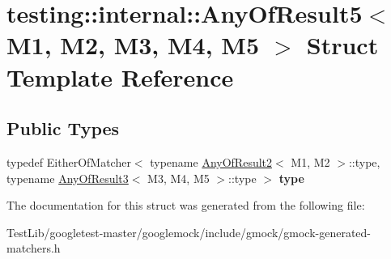 \hypertarget{structtesting_1_1internal_1_1AnyOfResult5}{}\section{testing\+:\+:internal\+:\+:Any\+Of\+Result5$<$ M1, M2, M3, M4, M5 $>$ Struct Template Reference}
\label{structtesting_1_1internal_1_1AnyOfResult5}
\subsection*{Public Types}
\begin{DoxyCompactItemize}
\item 
\mbox{\label{structtesting_1_1internal_1_1AnyOfResult5_a459a06dc5791313dce942668714f0c99}} 
typedef Either\+Of\+Matcher$<$ typename \hyperlink{structtesting_1_1internal_1_1AnyOfResult2}{Any\+Of\+Result2}$<$ M1, M2 $>$\+::type, typename \hyperlink{structtesting_1_1internal_1_1AnyOfResult3}{Any\+Of\+Result3}$<$ M3, M4, M5 $>$\+::type $>$ {\bfseries type}
\end{DoxyCompactItemize}


The documentation for this struct was generated from the following file\+:\begin{DoxyCompactItemize}
\item 
Test\+Lib/googletest-\/master/googlemock/include/gmock/gmock-\/generated-\/matchers.\+h\end{DoxyCompactItemize}
